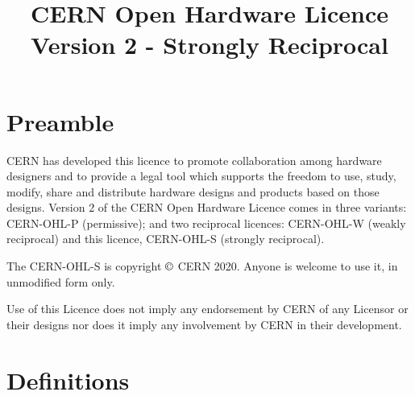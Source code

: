 \documentclass[10pt, a4paper]{article}
\title{CERN Open Hardware Licence Version 2 - Strongly Reciprocal}
\date{}
\begin{document}
\maketitle

\section*{Preamble}

CERN has developed this licence to promote collaboration among hardware designers and to provide a legal tool which supports the freedom to use, study, modify, share and distribute hardware designs and products based
on those designs. Version 2 of the CERN Open Hardware Licence comes in three variants: CERN-OHL-P (permissive); and two reciprocal licences: CERN-OHL-W (weakly reciprocal) and this licence, CERN-OHL-S (strongly reciprocal).

The CERN-OHL-S is copyright $\copyright$ CERN 2020. Anyone is welcome to use it, in unmodified form only.

Use of this Licence does not imply any endorsement by CERN of any Licensor or their designs nor does it imply any involvement by CERN in their development.

\section{Definitions}
\label{sec:definitions}
\end{document}
